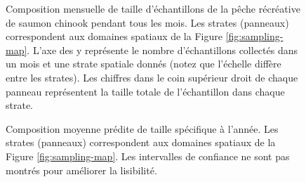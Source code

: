 \begin{figure}[htb]
    \centering
    \caption{Composition mensuelle de taille d'échantillons de la pêche récréative de saumon chinook pendant tous les mois. Les strates (panneaux) correspondent aux domaines spatiaux de la Figure \ref{fig:sampling-map}. L'axe des y représente le nombre d'échantillons collectés dans un mois et une strate spatiale donnés (notez que l'échelle diffère entre les strates). Les chiffres dans le coin supérieur droit de chaque panneau représentent la taille totale de l'échantillon dans chaque strate.}
    \label{fig:bar-rec-full-size}
\end{figure}

\begin{figure}[htb]
    \centering
    \caption{Composition moyenne prédite de taille spécifique à l'année. Les strates (panneaux) correspondent aux domaines spatiaux de la Figure \ref{fig:sampling-map}. Les intervalles de confiance ne sont pas montrés pour améliorer la lisibilité.}
    \label{fig:size-smooth-pred-rec-year}
\end{figure}

